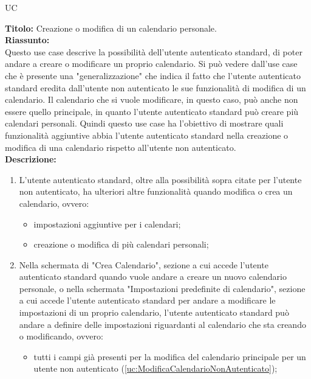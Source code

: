 \begin{listaPersonale}{UC}
\begin{listaPersonale2}[UC] {}
            \newpage
            \textbf{Titolo: } Creazione o modifica di un calendario personale. \\
            \textbf{Riassunto: } \\  Questo use case descrive la possibilità dell'utente autenticato standard, di poter andare a creare o modificare un proprio calendario. Si può vedere dall'use case che è presente una "generalizzazione" che indica il fatto che l'utente autenticato standard eredita dall'utente non autenticato le sue funzionalità di modifica di un calendario. Il calendario che si vuole modificare, in questo caso, può anche non essere quello principale, in quanto l'utente autenticato standard può creare più calendari personali. Quindi questo use case ha l'obiettivo di mostrare quali funzionalità aggiuntive abbia l'utente autenticato standard nella creazione o modifica di una calendario rispetto all'utente non autenticato. \\
            \textbf{Descrizione: }
            \begin{enumerate}
                \item L'utente autenticato standard, oltre alla possibilità sopra citate per l'utente non autenticato, ha ulteriori altre funzionalità quando modifica o crea un calendario, ovvero:
                      \begin{itemize}
                          \item impostazioni aggiuntive per i calendari;
                          \item creazione o modifica di più calendari personali;
                      \end{itemize}
                \item Nella schermata di "Crea Calendario", sezione a cui accede l'utente autenticato standard quando vuole andare a creare un nuovo calendario personale, o nella schermata "Impostazioni predefinite di calendario", sezione a cui accede l'utente autenticato standard per andare a modificare le impostazioni di un proprio calendario, l'utente autenticato standard può andare a definire delle impostazioni riguardanti al calendario che sta creando o modificando, ovvero:
                      \begin{itemize}
                          \item tutti i campi già presenti per la modifica del calendario principale per un utente non autenticato (\ref{uc:ModificaCalendarioNonAutenticato});

\end{itemize}
\end{enumerate}
\end{listaPersonale2}
\end{listaPersonale}
